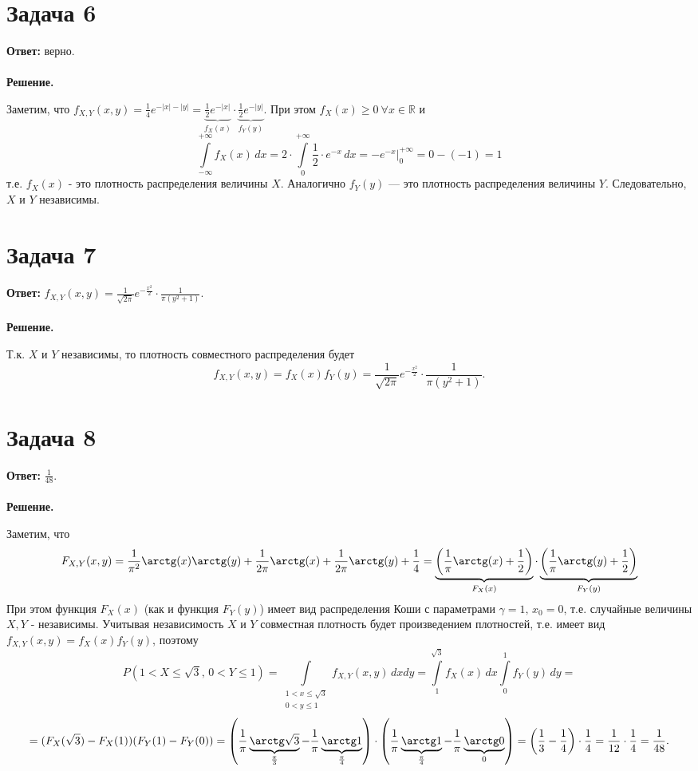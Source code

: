 \documentclass{article}
\begin{document}
\section*{Задача 6}
{\bf Ответ: } верно.
\\
\\
{\bf Решение.}
\par
Заметим, что $f_{X,Y}(x,y)=\frac{1}{4}e^{-|x|-|y|}=\underbrace{\frac{1}{2}e^{-|x|}}_{f_X(x)}\cdot\underbrace{\frac{1}{2}e^{-|y|}}_{f_Y(y)}$. При этом $f_X(x) \geq 0\ \forall x\in\mathbb{R}$ и 
$$\int\limits_{-\infty}^{+\infty} f_X(x)\,dx=2\cdot\int\limits_0^{+\infty} \frac{1}{2}\cdot e^{-x}\,dx=-e^{-x}\bigg|_0^{+\infty}=0-(-1)=1$$
т.е. $f_X(x)$ - это плотность распределения величины $X$. Аналогично $f_Y(y)$ — это плотность распределения величины $Y$. Следовательно, $X$ и $Y$ независимы.
\section*{Задача 7}
{\bf Ответ: } $f_{X,Y}(x,y)=\frac{1}{\sqrt{2\pi}}e^{-\frac{x^2}{2}}\cdot\frac{1}{\pi(y^2+1)}$.
\\
\\
{\bf Решение.}
\par
Т.к. $X$ и $Y$ независимы, то плотность совместного распределения будет 
$$f_{X,Y}(x,y)=f_X(x)f_Y(y)=\frac{1}{\sqrt{2\pi}}e^{-\frac{x^2}{2}}\cdot\frac{1}{\pi(y^2+1)}.$$
\section*{Задача 8}
{\bf Ответ: } $\frac{1}{48}$.
\\
\\
{\bf Решение.}
\par
Заметим, что 
$$F_{X,Y}(x,y)=\frac{1}{\pi^2}\arctg(x) \arctg(y) + \frac{1}{2\pi}\arctg(x) + \frac{1}{2\pi}\arctg(y) + \frac{1}{4}=\underbrace{\left(\frac{1}{\pi}\arctg(x) + \frac{1}{2}\right)}_{F_X(x)}\cdot\underbrace{\left(\frac{1}{\pi}\arctg(y) + \frac{1}{2}\right)}_{F_Y(y)}$$
При этом функция $F_X(x)$ (как и функция $F_Y(y)$) имеет вид распределения Коши с параметрами $\gamma=1,\,x_0=0$, т.е. случайные величины $X,Y$ - независимы. Учитывая независимость $X$ и $Y$ совместная плотность будет произведением плотностей, т.е. имеет вид $f_{X,Y}(x,y)=f_X(x)f_Y(y)$, поэтому
$$P(1 < X \leq \sqrt{3},\,0<Y \leq 1)=\int\limits_{\substack{1 < x \leq \sqrt{3}\\0 < y \leq 1}} f_{X,Y}(x,y)\,dx dy=\int\limits_1^{\sqrt{3}} f_X(x)\,dx\int\limits_0^1 f_Y(y)\,dy=$$
$$=(F_X(\sqrt{3})-F_X(1))(F_Y(1)-F_Y(0))=\left(\frac{1}{\pi}\underbrace{\arctg\sqrt{3}}_{\frac{\pi}{3}}-\frac{1}{\pi}\underbrace{\arctg 1}_{\frac{\pi}{4}}\right)\cdot\left(\frac{1}{\pi}\underbrace{\arctg 1}_{\frac{\pi}{4}}-\frac{1}{\pi}\underbrace{\arctg 0}_{0}\right)=\left(\frac{1}{3}-\frac{1}{4}\right)\cdot\frac{1}{4}=\frac{1}{12}\cdot\frac{1}{4}=\frac{1}{48}.$$
\end{document}
